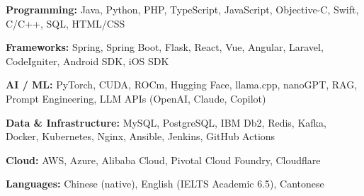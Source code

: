 

\begin{cventry}
    {} %
    {} %
    {} %
    {} %
    {
        \begin{cvitems}
            \item {\textbf{Programming:} Java, Python, PHP, TypeScript, JavaScript, Objective-C, Swift, C/C++, SQL, HTML/CSS}
            \item {\textbf{Frameworks:} Spring, Spring Boot, Flask, React, Vue, Angular, Laravel, CodeIgniter, Android SDK, iOS SDK}
            \item {\textbf{AI / ML:} PyTorch, CUDA, ROCm, Hugging Face, llama.cpp, nanoGPT, RAG, Prompt Engineering, LLM APIs (OpenAI, Claude, Copilot)}
            \item {\textbf{Data \& Infrastructure:} MySQL, PostgreSQL, IBM Db2, Redis, Kafka, Docker, Kubernetes, Nginx, Ansible, Jenkins, GitHub Actions}
            \item {\textbf{Cloud:} AWS, Azure, Alibaba Cloud, Pivotal Cloud Foundry, Cloudflare}
            \item {\textbf{Languages:} Chinese (native), English (IELTS Academic 6.5), Cantonese}
        \end{cvitems}
    }
\end{cventry}
